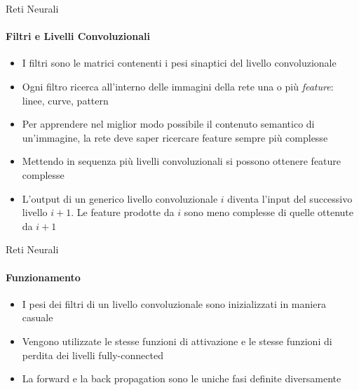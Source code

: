 \documentclass[
 ]{beamer}
\begin{document}
\begin{frame}{Reti Neurali}
    \framesubtitle{Filtri e Livelli Convoluzionali}  
    \begin{itemize} [<+->]
        \setlength\itemsep{1em}
         \item \large I filtri sono le matrici contenenti i pesi sinaptici del livello convoluzionale
        \item \large Ogni filtro ricerca all'interno delle immagini della rete una o più \emph{feature}: linee, curve, pattern
        \item \large Per apprendere nel miglior modo possibile il contenuto semantico di un'immagine, la rete deve saper ricercare feature sempre più complesse
        \item \large Mettendo in sequenza più livelli convoluzionali si possono ottenere feature complesse
        \item \large L'output di un generico livello convoluzionale $i$ diventa l'input del successivo livello $i+1$. Le feature prodotte da $i$ sono meno complesse di quelle ottenute da $i+1$
    \end{itemize}   
\end{frame}

\begin{frame}{Reti Neurali}
    \framesubtitle{Funzionamento}
    
    \begin{itemize} [<+->]
        \setlength\itemsep{3em}
        \item \large I pesi dei filtri di un livello convoluzionale sono inizializzati in maniera casuale
        \item \large Vengono utilizzate le stesse funzioni di attivazione e le stesse funzioni di perdita dei livelli fully-connected
        \item \large La forward e la back propagation sono le uniche fasi definite diversamente
    \end{itemize}
\end{frame}
\end{document}

